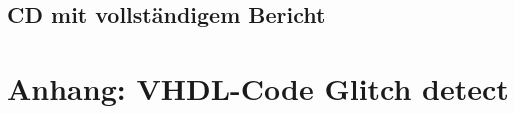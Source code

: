 \section{CD mit vollständigem Bericht}\label{sect.verzeichnis_literatur}

\newpage
\chapter{Anhang: VHDL-Code Glitch detect }\label{chap.anhang_2.vhdl_glitch}
%
%
%
%
%
%
%
%
%
%
%
%
%
%
%
%
%		
%
%	
